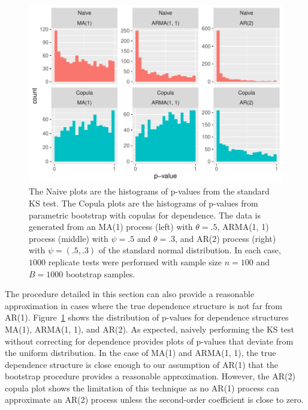 \documentclass[12pt, letterpaper, titlepage]{article}
\begin{document}
\begin{figure}[tbp]
  \centering
  \includegraphics[width=\textwidth]{hist_ma1_arma_ar2_D}
  \caption{The Naive plots are the histograms of p-values from the standard KS 
  test. The Copula plots are the histograms of p-values from parametric 
  bootstrap with copulas for dependence. The data is generated from an MA(1) 
  process (left) with $\theta = .5$, ARMA(1, 1) process (middle) with $\psi = 
  .5$ and $\theta = .3$, and AR(2) process (right) with $\psi = (.5, .3)$ of the 
  standard normal distribution. In each case, $1000$ replicate tests were 
  performed with sample size $n = 100$ and $B = 1000$ bootstrap samples.}
  \label{fig:hist_ma1_arma_ar2_D}
\end{figure}

The procedure detailed in this section can also provide a reasonable 
approximation in cases where the true dependence structure is not far from 
AR(1). Figure~\ref{fig:hist_ma1_arma_ar2_D} shows the distribution of p-values 
for dependence structures MA(1), ARMA(1, 1), and AR(2). As expected, 
naively performing the KS test without correcting for dependence provides plots 
of p-values that deviate from the uniform distribution. In the case of MA(1) 
and ARMA(1, 1), the true dependence structure is close enough to our 
assumption of AR(1) that the bootstrap procedure provides a reasonable 
approximation. However, the AR(2) copula plot shows the limitation of this 
technique as no AR(1) process can approximate an AR(2) process unless the
second-order coefficient is close to zero.
\end{document}
